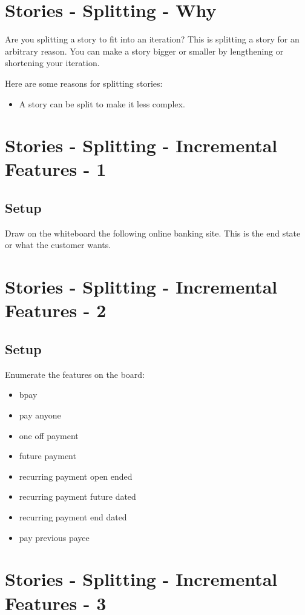 \section*{Stories - Splitting - Why}
Are you splitting a story to fit into an iteration? This is splitting a story for an arbitrary reason. You can make a story bigger or smaller by lengthening or shortening your iteration.

Here are some reasons for splitting stories:
\begin{itemize}
\item A story can be split to make it less complex.
\end{itemize}

\clearpage
\section*{Stories - Splitting - Incremental Features - 1}
\subsection*{Setup}
Draw on the whiteboard the following online banking site. This is the end state or what the customer wants.

\clearpage
\section*{Stories - Splitting - Incremental Features - 2}
\subsection*{Setup}
Enumerate the features on the board:
\begin{itemize}
\item bpay
\item pay anyone
\item one off payment
\item future payment
\item recurring payment open ended
\item recurring payment future dated
\item recurring payment end dated
\item pay previous payee
\end{itemize}

\section*{Stories - Splitting - Incremental Features - 3}
